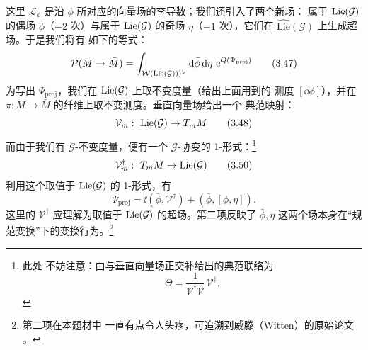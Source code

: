 这里 $\mathcal L_\phi$ 是沿 $\phi$ 所对应的向量场的李导数；我们还引入了两个新场：
属于 $\operatorname{Lie}(\mathcal G)$ 的偶场 $\bar\phi$（$-2$ 次）与属于 $\operatorname{Lie}(\mathcal G)$ 的奇场
$\eta$（$-1$ 次），它们在 $\widehat{\mathrm{Lie}}(\mathcal G)$ 上生成超场。于是我们将有
如下的等式：
\begin{equation}
\mathcal P(M\to\bar M) = \int_{\mathcal W(\operatorname{Lie}(\mathcal G)))^{\vee}}
\mathrm{d}\bar\phi\,\mathrm{d}\eta\ \mathrm{e}^{Q(\Psi_{\mathrm{proj}})}
\tag{3.47}
\end{equation}
为写出 $\Psi_{\mathrm{proj}}$，我们在 $\operatorname{Lie}(\mathcal G)$ 上取不变度量（给出上面用到的
测度 $[\dd\phi]$），并在 $\pi:M\to\bar M$ 的纤维上取不变测度。垂直向量场给出一个
典范映射：
\begin{equation}
\mathcal V_m:\ \operatorname{Lie}(\mathcal G)\to T_mM
\tag{3.48}
\end{equation}
而由于我们有 $\mathcal G$-不变度量，便有一个 $\mathcal G$-协变的 1-形式：\footnote{此处
不妨注意：由与垂直向量场正交补给出的典范联络为
\begin{equation}
\Theta = \frac{1}{\mathcal V^{\dagger}\mathcal V}\,\mathcal V^{\dagger}.
\tag{3.49}
\end{equation}}
\begin{equation}
\mathcal V_m^{\dagger}:\ T_mM\to\operatorname{Lie}(\mathcal G)
\tag{3.50}
\end{equation}
利用这个取值于 $\operatorname{Lie}(\mathcal G)$ 的 1-形式，有
\begin{equation}
\Psi_{\mathrm{proj}} = \ii(\bar\phi,\mathcal V^{\dagger})
+(\bar\phi,[\phi,\eta]).
\tag{3.51}
\end{equation}
这里的 $\mathcal V^{\dagger}$ 应理解为取值于 $\operatorname{Lie}(\mathcal G)$ 的超场。第二项反映了
$\bar\phi,\eta$ 这两个场本身在“规范变换”下的变换行为。\footnote{第二项在本题材中
一直有点令人头疼，可追溯到威滕（Witten）的原始论文 \cite{ref53}。}

